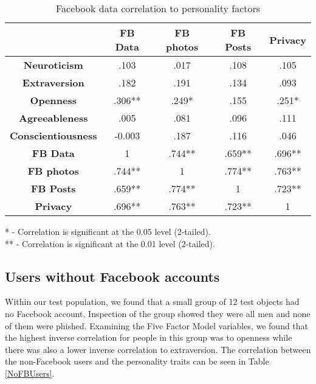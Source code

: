 \documentclass{sig-alternate}
\begin{document}
\begin{table*}[htbp]
\begin{center}
\begin{tabular}{|c|c|c|c|c|}
\hline
&  \textbf{FB Data} & \textbf{FB photos} & \textbf{FB Posts} & \textbf{Privacy}\\
\hline
\hline
\textbf{Neuroticism} &  .103 &	.017	&.108 &	.105\\
\hline
\textbf{Extraversion} & .182 & .191	& .134 &	.093\\
\hline
\textbf{Openness} & .306**	& .249*	 &.155	& .251*  \\
\hline
\textbf{Agreeableness} & .005	& .081 &	.096 &	.111\\
\hline
\textbf{Conscientiousness} & -0.003 &.187 &	.116 &	.046\\
\hline
\textbf{FB Data} & 1 &	.744** & .659** &	.696**\\
\hline
\textbf{FB photos} &.744** &	1	& .774** &	.763**\\
\hline
\textbf{FB Posts} & .659** &	.774**	& 1	& .723**\\
\hline
\textbf{Privacy} & .696**	& .763**	& .723**	& 1\\
\hline

\end{tabular}

\vspace{5mm}
* - Correlation is significant at the 0.05 level (2-tailed).\\
** - Correlation is significant at the 0.01 level (2-tailed).\\

\caption{Facebook data correlation to personality factors}
\label{FBTable}
\end{center}
\end{table*}



\subsection{Users without Facebook accounts}
Within our test population, we found that a small group of 
12 test objects had no Facebook account. Inspection of the group showed they were all men and none of them were phished. 
Examining the Five Factor Model variables, we found that the highest inverse correlation for people in this group was to openness while there was also a lower inverse correlation to extraversion. The correlation between the non-Facebook users and the personality traits can be seen in Table \ref{NoFBUsers}.
\end{document}
